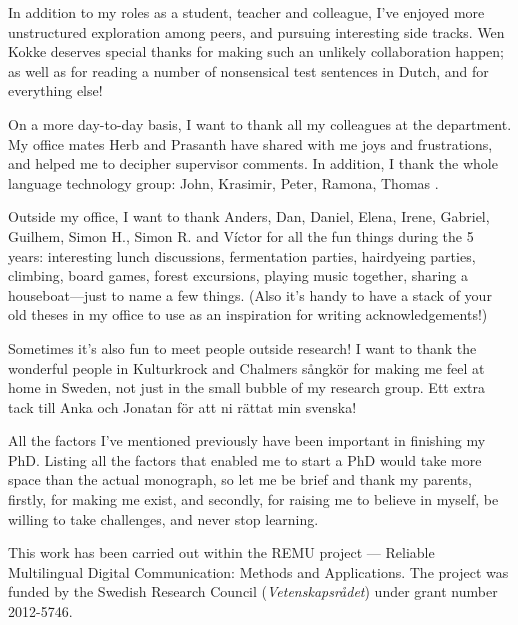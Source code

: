 In addition to my roles as a student, teacher and colleague, I've enjoyed
more unstructured exploration among peers, and pursuing interesting side tracks.
Wen Kokke deserves special thanks for making such an unlikely collaboration
happen; as well as for reading a number of nonsensical test sentences in Dutch,
and for everything else!

On a more day-to-day basis, I want to thank all my colleagues at the
department. My office mates Herb and Prasanth have shared with me joys
and frustrations, and helped me to decipher supervisor comments. In
addition, I thank the whole language technology group: John, Krasimir,
Peter, Ramona, Thomas .

Outside my office, I want to thank Anders, Dan, Daniel, Elena, Irene,
Gabriel, Guilhem, Simon H., Simon R. and Víctor for all the fun things
during the 5 years: interesting lunch discussions, fermentation
parties, hairdyeing parties, climbing, board games, forest excursions,
playing music together, sharing a houseboat---just to name a few
things. (Also it's handy to have a stack of your old theses in my
office to use as an inspiration for writing acknowledgements!)

Sometimes it's also fun to meet people outside research! I want to
thank the wonderful people in Kulturkrock and Chalmers sångkör for
making me feel at home in Sweden, not just in the small bubble of my
research group. Ett extra tack till Anka och Jonatan för att ni rättat
min svenska!

All the factors I've mentioned previously have been important in finishing
my PhD. Listing all the factors that enabled me to start a PhD would take
more space than the actual monograph, so let me be brief and thank my parents,
firstly, for making me exist, and secondly, for raising me to believe in myself,
be willing to take challenges, and never stop learning.

\vfill\noindent
This work has been carried out within the REMU project — Reliable Multilingual Digital Communication: Methods and Applications.
The project was funded by the Swedish Research Council (\emph{Vetenskapsrådet}) under grant number 2012-5746.
